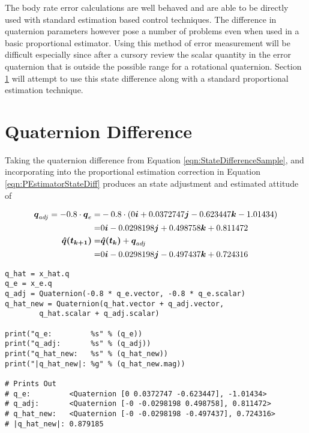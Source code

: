 The body rate error calculations are well behaved and are able to be directly used with standard estimation based control techniques.  The difference in quaternion parameters however pose a number of problems even when used in a basic proportional estimator.  Using this method of error measurement will be difficult especially since after a cursory review the scalar quantity in the error quaternion that is outside the possible range for a rotational quaternion.  Section \ref{sec:QuaternionDifference} will attempt to use this state difference along with a standard proportional estimation technique.

\section{Quaternion Difference}
\label{sec:QuaternionDifference}

Taking the quaternion difference from Equation \ref{eqn:StateDifferenceSample}, and incorporating into the proportional estimation correction in Equation \ref{eqn:PEstimatorStateDiff} produces an state adjustment and estimated attitude of

\begin{equation}
  \begin{aligned}
    \boldsymbol{q}_{adj} = -0.8 \cdot \boldsymbol{q}_e =& -0.8 \cdot (0 \boldsymbol{i} + 0.0372747 \boldsymbol{j} -0.623447 \boldsymbol{k} -1.01434 ) \\
                       =& 0 \boldsymbol{i} -0.0298198 \boldsymbol{j} +0.498758 \boldsymbol{k} +0.811472 \\
    \boldsymbol{\hat{q}(t_{k+1})} =& \boldsymbol{\hat{q}(t_{k})} + \boldsymbol{q}_{adj} \\
                       =& 0 \boldsymbol{i} -0.0298198 \boldsymbol{j} -0.497437 \boldsymbol{k} + 0.724316 \\
  \end{aligned}
\end{equation}

\begin{singlespace}
  \begin{verbatim}
q_hat = x_hat.q
q_e = x_e.q
q_adj = Quaternion(-0.8 * q_e.vector, -0.8 * q_e.scalar)
q_hat_new = Quaternion(q_hat.vector + q_adj.vector,
        q_hat.scalar + q_adj.scalar)

print("q_e:         %s" % (q_e))
print("q_adj:       %s" % (q_adj))
print("q_hat_new:   %s" % (q_hat_new))
print("|q_hat_new|: %g" % (q_hat_new.mag))

# Prints Out
# q_e:         <Quaternion [0 0.0372747 -0.623447], -1.01434>
# q_adj:       <Quaternion [-0 -0.0298198 0.498758], 0.811472>
# q_hat_new:   <Quaternion [-0 -0.0298198 -0.497437], 0.724316>
# |q_hat_new|: 0.879185
  \end{verbatim}
\nocite{minted}
\end{singlespace}

